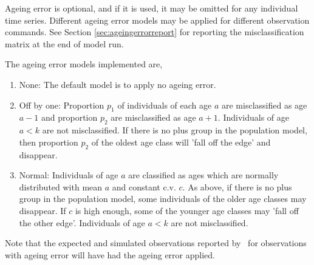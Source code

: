 Ageing error is optional, and if it is used, it may be omitted for any individual time series. Different ageing error models may be applied for different observation commands. See Section \ref{sec:ageingerrorreport} for reporting the misclassification matrix at the end of model run.

The ageing error models implemented are,
\begin{enumerate}
	\item{None}: The default model is to apply no ageing error.
	\item{Off by one}: Proportion $p_1$ of individuals of each age $a$ are misclassified as age $a-1$ and proportion $p_2$ are misclassified as age $a+1$. Individuals of age $a < k$ are not misclassified. If there is no plus group in the population model, then proportion $p_2$ of the oldest age class will 'fall off the edge' and disappear. 
	\item{Normal}: Individuals of age $a$ are classified as ages which are normally distributed with mean $a$ and constant c.v. $c$. As above, if there is no plus group in the population model, some individuals of the older age classes may disappear. If $c$ is high enough, some of the younger age classes may 'fall off the other edge'. Individuals of age $a < k$ are not misclassified.
\end{enumerate}

Note that the expected and simulated observations reported by \IBM\ for observations with ageing error will have had the ageing error applied. 


